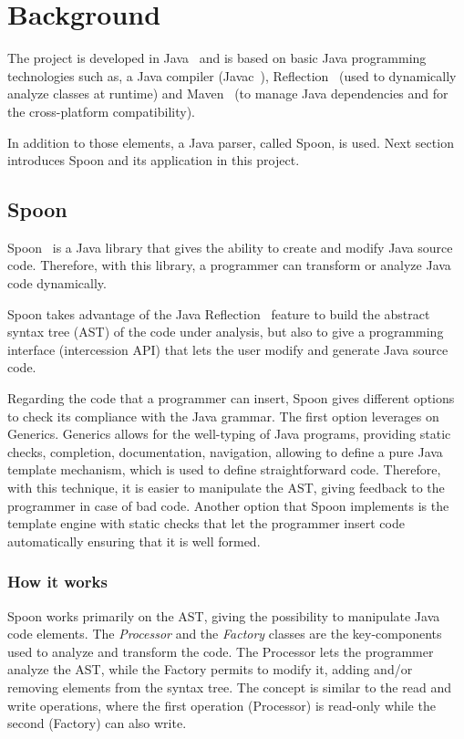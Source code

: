 \chapter{Background}\label{ch:background}
The project is developed in Java~\cite{Arnold:2000:JPL:556709} and is based on basic Java programming technologies such as, a Java compiler (Javac~\cite{javacWiki}), Reflection~\cite{reflect} (used to dynamically analyze classes at runtime) and Maven~\cite{bharathan2015apache} (to manage Java dependencies and for the cross-platform compatibility).

In addition to those elements, a Java parser, called Spoon, is used. Next section introduces Spoon and its application in this project.

\section{Spoon}\label{sec:spoon}
Spoon~\cite{pawlak:hal-01169705} is a Java library that gives the ability to create and modify Java source code. Therefore, with this library, a programmer can transform or analyze Java code dynamically.

Spoon takes advantage of the Java Reflection~\cite{reflect} feature to build the abstract syntax tree (AST) of the code under analysis, but also to give a programming interface (intercession API) that lets the user modify and generate Java source code.


Regarding the code that a programmer can insert, Spoon gives different options to check its compliance with the Java grammar. The first option leverages on Generics.
Generics allows for the well-typing of Java programs, providing static checks, completion, documentation, navigation, allowing to define a pure Java template mechanism, which is used to define straightforward code. Therefore, with this technique, it is easier to manipulate the AST, giving feedback to the programmer in case of bad code. Another option that Spoon implements is the template engine with static checks that let the programmer insert code automatically ensuring that it is well formed.


\subsection*{How it works}\label{subsec:howSpoon}
Spoon works primarily on the AST, giving the possibility to manipulate Java code elements. The \emph{Processor} and the \emph{Factory} classes are the key-components used to analyze and transform the code. The Processor lets the programmer analyze the AST, while the Factory permits to modify it, adding and/or removing elements from the syntax tree. The concept is similar to the read and write operations, where the first operation (Processor) is read-only while the second (Factory) can also write.

